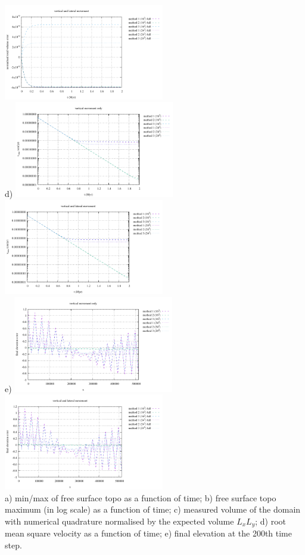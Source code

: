 \begin{center}
   \includegraphics[width=7cm]{python_codes/fieldstone_54/images/exp1/volume_full.pdf}\\
d) \includegraphics[width=7cm]{python_codes/fieldstone_54/images/exp1/vrms_vert.pdf}
   \includegraphics[width=7cm]{python_codes/fieldstone_54/images/exp1/vrms_full.pdf}\\
e) \includegraphics[width=7cm]{python_codes/fieldstone_54/images/exp1/surface_topography_200_vert.pdf}
   \includegraphics[width=7cm]{python_codes/fieldstone_54/images/exp1/surface_topography_200_full.pdf}\\
{\captionfont 
a) min/max of free surface topo as a function of time; 
b) free surface topo maximum (in log scale) as a function of time; 
c) measured volume of the domain with numerical quadrature normalised by the expected volume $L_xL_y$;
d) root mean square velocity as a function of time;
e) final elevation at the 200th time step.}
\end{center}


